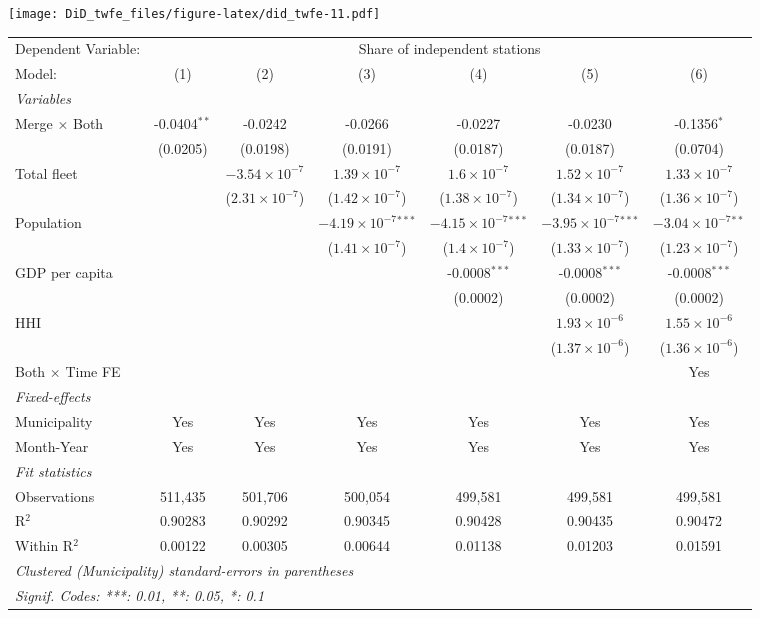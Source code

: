 \documentclass[
]{article}
\begin{document}
\texttt{[image: DiD\_twfe\_files/figure-latex/did\_twfe-11.pdf]}

\begin{tabular}{lcccccc}
\tabularnewline\midrule\midrule
Dependent Variable:&\multicolumn{6}{c}{Share of independent stations}\\
Model:&(1) & (2) & (3) & (4) & (5) & (6)\\
\midrule \emph{Variables}&   &   &   &   &   &  \\
Merge $\times $ Both & -0.0404$^{**}$ & -0.0242 & -0.0266 & -0.0227 & -0.0230 & -0.1356$^{*}$\\
  &(0.0205) & (0.0198) & (0.0191) & (0.0187) & (0.0187) & (0.0704)\\
Total fleet &    & $-3.54\times 10^{-7}$ & $1.39\times 10^{-7}$ & $1.6\times 10^{-7}$ & $1.52\times 10^{-7}$ & $1.33\times 10^{-7}$\\
  &   & ($2.31\times 10^{-7}$) & ($1.42\times 10^{-7}$) & ($1.38\times 10^{-7}$) & ($1.34\times 10^{-7}$) & ($1.36\times 10^{-7}$)\\
Population &    &    & $-4.19\times 10^{-7}$$^{***}$ & $-4.15\times 10^{-7}$$^{***}$ & $-3.95\times 10^{-7}$$^{***}$ & $-3.04\times 10^{-7}$$^{**}$\\
  &   &    & ($1.41\times 10^{-7}$) & ($1.4\times 10^{-7}$) & ($1.33\times 10^{-7}$) & ($1.23\times 10^{-7}$)\\
GDP per capita &    &    &    & -0.0008$^{***}$ & -0.0008$^{***}$ & -0.0008$^{***}$\\
  &   &    &    & (0.0002) & (0.0002) & (0.0002)\\
HHI &    &    &    &    & $1.93\times 10^{-6}$ & $1.55\times 10^{-6}$\\
  &   &    &    &    & ($1.37\times 10^{-6}$) & ($1.36\times 10^{-6}$)\\
Both $\times$ Time FE &  &  &  &  &  & Yes\\
\midrule \emph{Fixed-effects}&   &   &   &   &   &  \\
Municipality & Yes & Yes & Yes & Yes & Yes & Yes\\
Month-Year & Yes & Yes & Yes & Yes & Yes & Yes\\
\midrule \emph{Fit statistics}&  & & & & & \\
Observations & 511,435&501,706&500,054&499,581&499,581&499,581\\
R$^2$ & 0.90283&0.90292&0.90345&0.90428&0.90435&0.90472\\
Within R$^2$ & 0.00122&0.00305&0.00644&0.01138&0.01203&0.01591\\
\midrule\midrule\multicolumn{7}{l}{\emph{Clustered (Municipality) standard-errors in parentheses}}\\
\multicolumn{7}{l}{\emph{Signif. Codes: ***: 0.01, **: 0.05, *: 0.1}}\\
\end{tabular}
\end{document}
